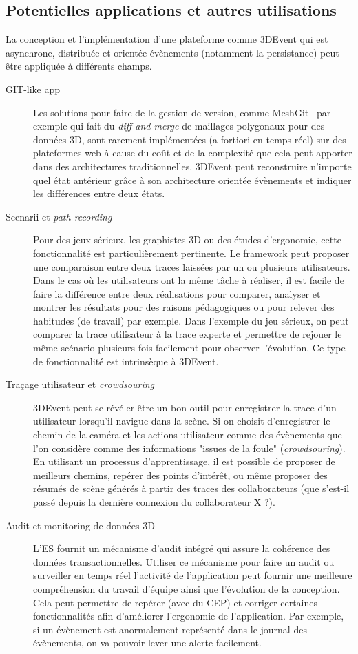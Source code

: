 \subsection{Potentielles applications et autres utilisations}
La conception et l'implémentation d'une plateforme comme 3DEvent qui est 
asynchrone, distribuée et orientée évènements  (notamment la persistance) peut 
être appliquée à différents champs.
\begin{description}
	\item[GIT-like app] Les solutions pour faire de la gestion de version, comme 
	MeshGit~\cite{Denning2013} par exemple qui fait du
	\textit{diff and merge} de maillages polygonaux pour des données 3D, 
	sont rarement implémentées (a fortiori en 
	temps-réel) sur des plateformes web à cause du coût et de la complexité que 
	cela peut apporter dans des architectures traditionnelles. 3DEvent peut 
	reconstruire n'importe quel état antérieur grâce à son architecture orientée 
	évènements et indiquer les différences entre deux états.
	
	\item[Scenarii et \textit{path recording}] Pour des jeux sérieux, les graphistes 
	3D ou des études d'ergonomie, cette fonctionnalité est particulièrement 
	pertinente. Le \gls{framework} peut proposer une comparaison entre deux traces 
	laissées par un ou plusieurs utilisateurs. Dans le cas où les utilisateurs ont la 
	même tâche à réaliser, il est facile de faire la différence entre deux réalisations 
	pour comparer, analyser et montrer les résultats	pour des raisons 
	pédagogiques ou pour relever des habitudes (de travail) par exemple. Dans 
	l'exemple du jeu sérieux, on peut comparer la trace utilisateur à la trace experte 
	et permettre de rejouer le même scénario plusieurs fois facilement pour 
	observer l'évolution. Ce type de fonctionnalité est intrinsèque à 3DEvent. 
	
	\item[Traçage utilisateur et \textit{crowdsouring}] 3DEvent peut se révéler être 
	un bon outil pour enregistrer la trace d'un utilisateur lorsqu'il navigue dans la 
	scène. Si on choisit d'enregistrer le chemin de la caméra et les actions 
	utilisateur comme des évènements que l'on considère comme des informations 
	"issues de la foule" (\textit{crowdsouring}). En utilisant un processus 
	d'apprentissage, il est possible de proposer de meilleurs chemins, repérer des 
	points d'intérêt, ou même proposer des résumés de scène générés à partir des 
	traces des collaborateurs (que s'est-il passé depuis la dernière connexion du 
	collaborateur X ?).
	\item[Audit et monitoring de données 3D] L'\gls{ES} fournit un mécanisme 
	d'audit intégré qui assure la cohérence des données transactionnelles. Utiliser 
	ce mécanisme pour faire un audit ou surveiller en temps réel l'activité de 
	l'application peut fournir une meilleure compréhension du travail d'équipe ainsi 
	que l'évolution de la conception. Cela peut permettre de repérer (avec du 
	\gls{CEP}) et corriger certaines fonctionnalités afin d'améliorer l'ergonomie de 
	l'application. Par exemple, si un évènement est anormalement représenté dans 
	le journal des évènements, on va pouvoir lever une alerte facilement.
\end{description}
